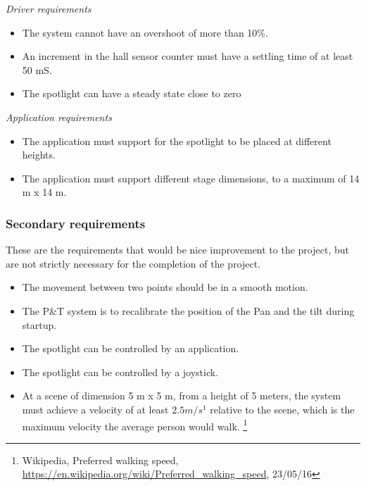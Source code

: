 \textit{Driver requirements}
\begin{itemize}
\item The system cannot have an overshoot of more than 10\%.

\item An increment in the hall sensor counter must have a settling time of at least 50 mS. 


\item The spotlight can have a steady state close to zero
\end{itemize}


\textit{Application requirements}
\begin{itemize}

\item The application must support for the spotlight to be placed at different heights.

\item The application must support different stage dimensions, to a maximum of 14 m x 14 m. 

\end{itemize}


\subsubsection{Secondary requirements}
These are the requirements that would be nice improvement to the project, but are not strictly necessary for the completion of the project. 

\begin{itemize}
\item The movement between two points should be in a smooth motion.

\item The P\&T system is to recalibrate the position of the Pan and the tilt during startup.

\item The spotlight can be controlled by an application.

\item The spotlight can be controlled by a joystick.

\item At a scene of dimension 5 m x 5 m, from a height of 5 meters, the system must achieve a velocity of at least $2.5 m/s^{1}$ relative to the scene, which is the maximum velocity the average person would walk. 
\footnote{Wikipedia, Preferred walking speed, \url{https://en.wikipedia.org/wiki/Preferred_walking_speed}, 23/05/16}

\end{itemize}
